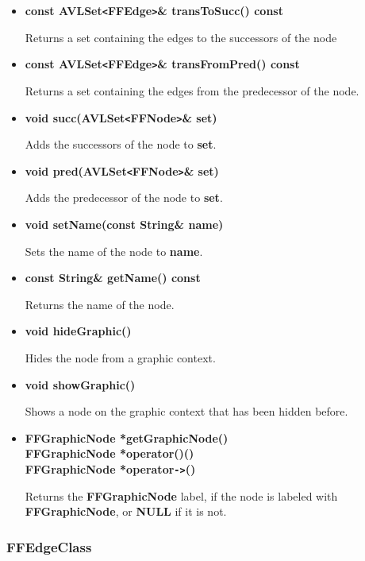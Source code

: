 \begin{itemize}
Returns a set containing the predecessor of the node.

\item{\bf const AVLSet\verb|<|FFEdge\verb|>|\& transToSucc() const}

Returns a set containing the edges to the successors of the node

\item{\bf const AVLSet\verb|<|FFEdge\verb|>|\& transFromPred()
    const}

Returns a set containing the edges from the predecessor of the node.

\item{\bf void succ(AVLSet\verb|<|FFNode\verb|>|\& set)}

Adds the successors of the node to {\bf set}.

\item{\bf void pred(AVLSet\verb|<|FFNode\verb|>|\& set)}

Adds the predecessor of the node to {\bf set}.
  
\item{\bf void setName(const String\& name)}

Sets the name of the node to {\bf name}.

\item{\bf const String\& getName() const}

Returns the name of the node.
  
\item{\bf void hideGraphic()}

Hides the node from a graphic context.

\item{\bf void showGraphic()}

Shows a node on the graphic context that has been hidden before.
  
\item{\bf FFGraphicNode *getGraphicNode() \\
    FFGraphicNode *operator()() \\
    FFGraphicNode *operator\verb|->|()}

Returns the {\bf FFGraphicNode} label, if the node is labeled with
{\bf FFGraphicNode}, or {\bf NULL} if it is not.

\end{itemize}

\subsubsection{FFEdgeClass}

